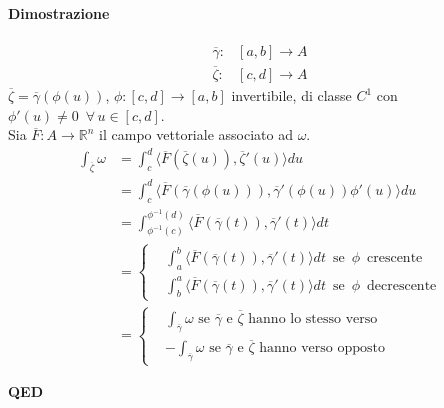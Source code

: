 \documentclass{article}
\newcommand{\R}{\mathbb{R}}
\begin{document}
\paragraph{{Dimostrazione}}
\begin{align*}
    \overline{\gamma}:& [a,b]\rightarrow A\\
    \overline{\zeta}:&[c,d]\rightarrow A
\end{align*}
$\overline{\zeta}=\overline{\gamma}(\phi(u))$, $\phi:[c,d]\rightarrow[a,b]$
invertibile, di classe $C^1$ con $\phi'(u)\neq 0 \,\,\, \forall \, u \in [c,d]$.\\
Sia $\overline{F} : A \rightarrow \R^n$ il campo vettoriale associato ad $\omega$.\\
 \begin{align*}
     \int_{\overline{\zeta}} \omega& = \int_c^d \langle  \overline{F}(\overline{\zeta}(u)),\overline{\zeta}'(u) \rangle du \\
     &= \int_c^d \langle \overline{F}(\overline{\gamma}(\phi(u))),\overline{\gamma}'(\phi(u)) \phi' (u)\rangle du\\
     &=\int_{\phi^{-1}(c)}^{\phi^{-1}(d)}\langle \overline{F}(\overline{\gamma}(t)), \overline{\gamma}'(t)\rangle dt\\
     &=\begin{cases}
       & \int_a^b \langle \overline{F}(\overline{\gamma}(t)), \overline{\gamma}'(t) \rangle dt\,\,\, \text{se}\,\,\, \phi \,\,\, \text{crescente}  \\
       & \int_b^a \langle \overline{F}(\overline{\gamma}(t)), \overline{\gamma}'(t) \rangle dt\,\,\, \text{se}\,\,\, \phi \,\,\, \text{decrescente}
     \end{cases}\\
     &=\begin{cases}
       &\int_{\overline{\gamma}}\omega \text{  se  } \overline{\gamma} \text{  e  }\overline{\zeta} \text{  hanno lo stesso verso}\\
        &-\int_{\overline{\gamma}}\omega \text{  se  } \overline{\gamma} \text{  e  } \overline{\zeta} \text{  hanno verso opposto}
     \end{cases}
 \end{align*}
 \begin{flushright}
   \textbf{QED}
 \end{flushright}
\end{document}
